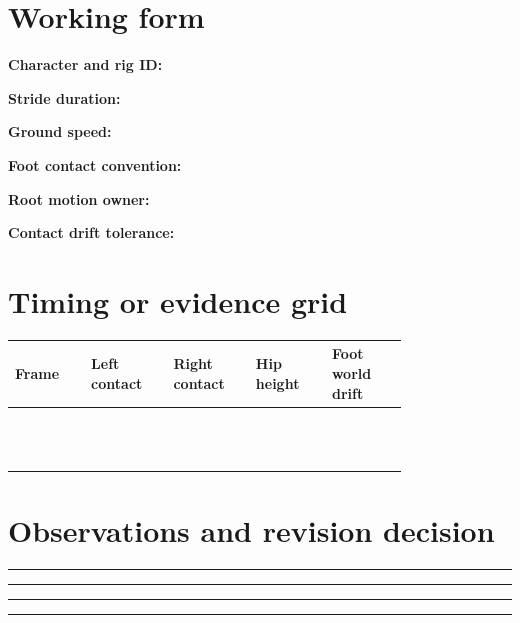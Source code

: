 \documentclass[10pt,letterpaper]{article}
\begin{document}
\section{Working form}
\noindent\textbf{Character and rig ID:}\quad\hrulefill\par\vspace{10pt}
\noindent\textbf{Stride duration:}\quad\hrulefill\par\vspace{10pt}
\noindent\textbf{Ground speed:}\quad\hrulefill\par\vspace{10pt}
\noindent\textbf{Foot contact convention:}\quad\hrulefill\par\vspace{10pt}
\noindent\textbf{Root motion owner:}\quad\hrulefill\par\vspace{10pt}
\noindent\textbf{Contact drift tolerance:}\quad\hrulefill\par\vspace{10pt}\section{Timing or evidence grid}
\begin{longtable}{|p{0.156\linewidth}|p{0.156\linewidth}|p{0.156\linewidth}|p{0.156\linewidth}|p{0.156\linewidth}|}
\hline
\textbf{Frame} & \textbf{Left contact} & \textbf{Right contact} & \textbf{Hip height} & \textbf{Foot world drift}\\\hline
\endhead
\rule{0pt}{20pt} &  &  &  & \\\hline
\rule{0pt}{20pt} &  &  &  & \\\hline
\rule{0pt}{20pt} &  &  &  & \\\hline
\rule{0pt}{20pt} &  &  &  & \\\hline
\rule{0pt}{20pt} &  &  &  & \\\hline
\rule{0pt}{20pt} &  &  &  & \\\hline
\rule{0pt}{20pt} &  &  &  & \\\hline
\rule{0pt}{20pt} &  &  &  & \\\hline
\rule{0pt}{20pt} &  &  &  & \\\hline
\rule{0pt}{20pt} &  &  &  & \\\hline
\rule{0pt}{20pt} &  &  &  & \\\hline
\rule{0pt}{20pt} &  &  &  & \\\hline
\end{longtable}
\section{Observations and revision decision}
\noindent\rule{\linewidth}{0.4pt}\par\vspace{18pt}\noindent\rule{\linewidth}{0.4pt}\par\vspace{18pt}\noindent\rule{\linewidth}{0.4pt}\par\vspace{18pt}\noindent\rule{\linewidth}{0.4pt}\par\vspace{18pt}
\end{document}
